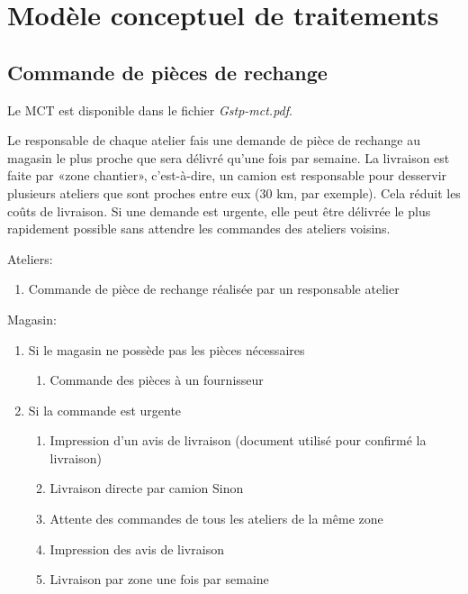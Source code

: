 \section{Modèle conceptuel de traitements}

\subsection{Commande de pièces de rechange}

Le MCT est disponible dans le fichier {\sl Gstp-mct.pdf}.

Le responsable de chaque atelier fais une demande de pièce de rechange au
magasin le plus proche que sera délivré qu'une fois par semaine.  La
livraison est faite par «zone chantier», c'est-à-dire, un camion est
responsable pour desservir plusieurs ateliers que sont proches entre eux
(30 km, par exemple). Cela réduit les coûts de livraison.
Si une demande est urgente, elle peut être délivrée le plus rapidement
possible sans attendre les commandes des ateliers voisins.

Ateliers:
\begin{enumerate}
    \item Commande de pièce de rechange réalisée par un responsable atelier
\end{enumerate}

Magasin:
\begin{enumerate}
    \item Si le magasin ne possède pas les pièces nécessaires
    \begin{enumerate}
        \item Commande des pièces à un fournisseur
    \end{enumerate}

    \item Si la commande est urgente
    \begin{enumerate}
        \item Impression d'un avis de livraison
        (document utilisé pour confirmé la livraison)
        \item Livraison directe par camion
        Sinon
        \item Attente des commandes de tous les ateliers de la même zone
        \item Impression des avis de livraison
        \item Livraison par zone une fois par semaine
    \end{enumerate}
\end{enumerate}

